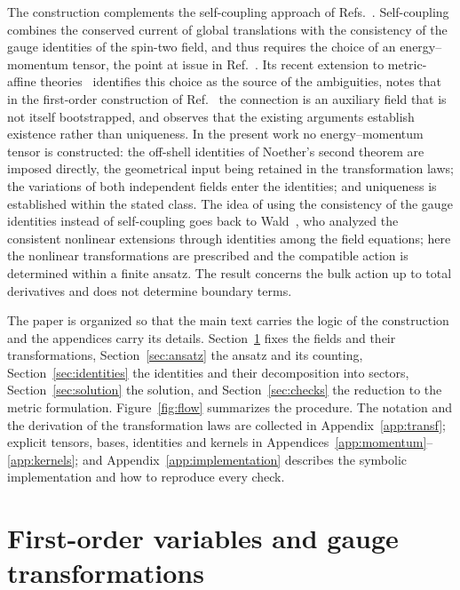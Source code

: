 \documentclass[prd,aps,preprint,nofootinbib,amsmath,amssymb,eqsecnum]{revtex4-2}
\begin{document}
The construction complements the self-coupling approach of
Refs.~\cite{Deser1970,Deser2010}. Self-coupling combines the conserved current of global
translations with the consistency of the gauge identities of the spin-two field, and thus
requires the choice of an energy--momentum tensor, the point at issue in
Ref.~\cite{Padmanabhan2008}. Its recent extension to metric-affine theories~\cite{Delhom2023}
identifies this choice as the source of the ambiguities, notes that in the first-order
construction of Ref.~\cite{Deser1970} the connection is an auxiliary field that is not itself
bootstrapped, and observes that the existing arguments establish existence rather than
uniqueness. In the present work no energy--momentum tensor is constructed: the off-shell identities of
Noether's second theorem are imposed directly, the geometrical input being retained in the
transformation laws; the variations of both independent fields enter the identities; and
uniqueness is established within the stated class. The idea of using the consistency of the
gauge identities instead of self-coupling goes back to Wald~\cite{Wald1986}, who analyzed the
consistent nonlinear extensions through identities among the field equations; here the
nonlinear transformations are prescribed and the compatible action is determined within a
finite ansatz. The result concerns the bulk action up to total derivatives and does not
determine boundary terms.

The paper is organized so that the main text carries the logic of the construction and the
appendices carry its details. Section~\ref{sec:variables} fixes the fields and their
transformations, Section~\ref{sec:ansatz} the ansatz and its counting, Section~\ref{sec:identities}
the identities and their decomposition into sectors, Section~\ref{sec:solution} the solution,
and Section~\ref{sec:checks} the reduction to the metric formulation. Figure~\ref{fig:flow} summarizes the procedure. The notation and the derivation of the
transformation laws are collected in Appendix~\ref{app:transf}; explicit tensors, bases,
identities and kernels in Appendices~\ref{app:momentum}--\ref{app:kernels}; and
Appendix~\ref{app:implementation} describes the symbolic implementation and how to reproduce
every check.

\section{First-order variables and gauge transformations}
\label{sec:variables}
\end{document}
